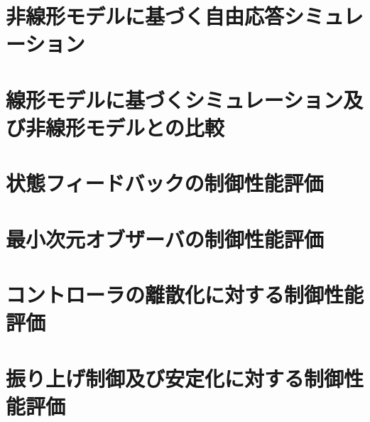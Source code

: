 \section{非線形モデルに基づく自由応答シミュレーション}
\section{線形モデルに基づくシミュレーション及び非線形モデルとの比較}
\section{状態フィードバックの制御性能評価}
\section{最小次元オブザーバの制御性能評価}
\section{コントローラの離散化に対する制御性能評価}
\section{振り上げ制御及び安定化に対する制御性能評価}
